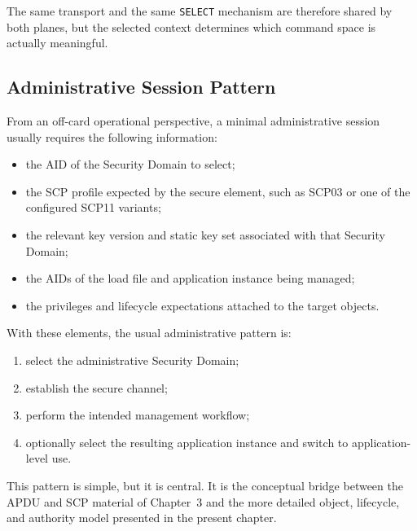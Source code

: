 The same transport and the same \texttt{SELECT} mechanism are therefore
shared by both planes, but the selected context determines which command
space is actually meaningful.

\subsection{Administrative Session Pattern}
\label{sec:gp-admin-session-pattern}


From an off-card operational perspective, a minimal administrative
session usually requires the following information:

\begin{itemize}
\item the AID of the Security Domain to select;
\item the SCP profile expected by the secure element, such as SCP03 or one of
  the configured SCP11 variants;
\item the relevant key version and static key set associated with that
  Security Domain;
\item the AIDs of the load file and application instance being managed;
\item the privileges and lifecycle expectations attached to the target
  objects.
\end{itemize}

With these elements, the usual administrative pattern is:

\begin{enumerate}
\item select the administrative Security Domain;
\item establish the secure channel;
\item perform the intended management workflow;
\item optionally select the resulting application instance and switch to
  application-level use.
\end{enumerate}

This pattern is simple, but it is central. It is the conceptual bridge
between the APDU and SCP material of Chapter~3 and the more detailed
object, lifecycle, and authority model presented in the present chapter.


